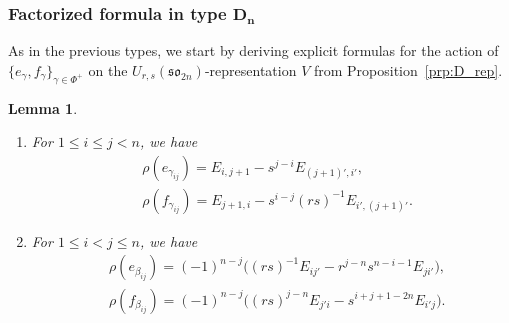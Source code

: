 \documentclass[pdftex]{sigma}
\numberwithin{equation}{section}
\newtheorem{Lemma}[Theorem]{Lemma}
\newcommand{\sso}{\mathfrak{so}}
\begin{document}
\subsubsection[Factorized formula in type D\_n]{Factorized formula in type $\boldsymbol{D_{n}}$}

As in the previous types, we start by deriving explicit formulas for the action of $\{e_\gamma,f_\gamma\}_{\gamma\in \Phi^+}$ on the $U_{r,s}(\sso_{2n})$-representation $V$ from Proposition~\ref{prp:D_rep}.

\begin{Lemma}\quad\samepage
\begin{enumerate}
\item[$(a)$] For $1 \le i \le j < n$, we have
\begin{displaymath}
\begin{split}
 &\rho(e_{\gamma_{ij}})= E_{i,j + 1} - s^{j - i}E_{(j + 1)',i'},\\
 &\rho(f_{\gamma_{ij}})= E_{j + 1,i} - s^{i - j}(rs)^{-1}E_{i',(j + 1)'}.
\end{split}
\end{displaymath}

\item[$(b)$] For $1 \le i < j \le n$, we have
\begin{displaymath}
\begin{split}
 &\rho(e_{\beta_{ij}})= (-1)^{n - j}\bigl((rs)^{-1}E_{ij'} - r^{j - n}s^{n - i - 1} E_{ji'}\bigr), \\
 &\rho(f_{\beta_{ij}})= (-1)^{n-j}\bigl((rs)^{j - n}E_{j'i} - s^{i + j + 1 - 2n}E_{i'j}\bigr).
\end{split}
\end{displaymath}
\end{enumerate}
\end{Lemma}
\end{document}
